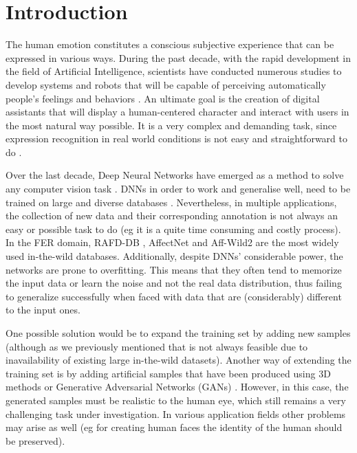 \documentclass[10pt,twocolumn,letterpaper]{article}
\begin{document}
\section{Introduction}
\label{sec:intro}

The human emotion constitutes a conscious subjective experience that can be expressed in various ways. During the past decade, with the rapid development in the field of Artificial Intelligence, scientists have conducted numerous studies to develop systems and robots that will be capable of perceiving automatically people’s feelings and behaviors \cite{kollias2016line,kollias2017adaptation}. An ultimate goal is the creation of digital assistants that will display a human-centered character and interact with users in the most natural way possible. It is a very complex and demanding task, since expression recognition in real world conditions is not easy and straightforward to do \cite{kollias2018training,kollias2015interweaving}.

Over the last decade, Deep Neural Networks have emerged as a method to solve any computer vision task \cite{tagaris1,tagaris2,mdpi}. DNNs in order to work and generalise well, need to be trained on large and diverse databases \cite{kollias2020exploiting,kollias2018old}. Nevertheless, in multiple applications, the collection of new data and their corresponding annotation is not always an easy or possible task to do (eg it is a quite time consuming and costly process). In the FER domain, RAFD-DB \cite{li2017reliable,li2019reliable}, AffectNet \cite{mollahosseini2017affectnet} and Aff-Wild2 \cite{kollias2022abaw,kollias2017recognition,kollias2019expression,kollias2019face,kollias2020analysing,kollias2021affect,kollias2021analysing,kollias2021distribution,zafeiriou2017aff,kollias2019deep,kollias2018multi,kollias2018aff} are the most widely used in-the-wild databases.
Additionally, despite DNNs' considerable power, the networks are prone to overfitting. This means that they often tend to memorize the input data or learn the noise and not the real data distribution, thus failing to generalize successfully when faced with data that are (considerably) different to the input ones.


One possible solution would be to expand the training set by adding new samples (although as we previously mentioned that is not always feasible due to inavailability of existing large in-the-wild datasets). Another way of extending the training set is by adding artificial samples that have been produced using 3D  methods \cite{fried2016perspective, averbuch2017bringing,thies2016face2face, kollias2018photorealistic,kollias2020deep} or Generative Adversarial Networks (GANs) \cite{goodfellow2014generative,zhou2017photorealistic,ding2018exprgan,pumarola2018ganimation,kollias2020va}. However, in this case, the generated samples must be realistic to the human eye, which still remains a very challenging task under investigation. In various application fields other problems may arise as well (eg for creating human faces the identity of the human should be preserved).  
\end{document}
